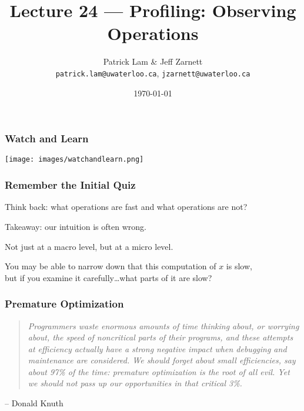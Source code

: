 


\title{Lecture 24 --- Profiling: Observing Operations }

\author{Patrick Lam \& Jeff Zarnett \\ \small \texttt{patrick.lam@uwaterloo.ca}, \texttt{jzarnett@uwaterloo.ca}}
\date{\today}




\begin{frame}
  \titlepage

 \end{frame}



\begin{frame}
\frametitle{Watch and Learn}

\begin{center}
	\texttt{[image: images/watchandlearn.png]}
\end{center}

\end{frame}

\begin{frame}
\frametitle{Remember the Initial Quiz}


Think back: what operations are fast and what operations are not?

Takeaway: our intuition  is often wrong. 

Not just at a macro level, but at a micro level. 

You may be able to narrow down that this computation of $x$ is slow, \\
but if you examine it carefully\ldots what parts of it are slow?


\end{frame}



\begin{frame}
\frametitle{Premature Optimization}

\vspace*{.5cm}

\begin{quote}
\textit{Programmers waste enormous amounts of time thinking about, or worrying about, the speed of noncritical parts of their programs, and these attempts at efficiency actually have a strong negative impact when debugging and maintenance are considered. We should forget about small efficiencies, say about 97\% of the time: premature optimization is the root of all evil. Yet we should not pass up our opportunities in that critical 3\%.}
\end{quote}
	\hfill -- Donald Knuth


\end{frame}




